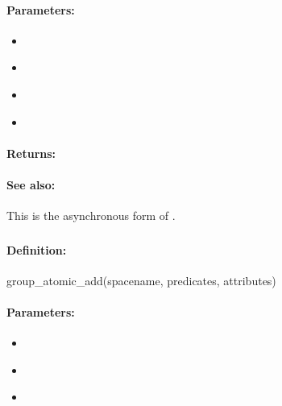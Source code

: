 \paragraph{Parameters:}
\begin{itemize}[noitemsep]
\item {}\\

\item {}\\

\item {}\\

\item {}\\

\end{itemize}

\paragraph{Returns:}


\paragraph{See also:}  This is the asynchronous form of .

\pagebreak
\subsubsection{}
\label{api:ruby:group_atomic_add}


\paragraph{Definition:}
\begin{rubycode}
group_atomic_add(spacename, predicates, attributes)
\end{rubycode}

\paragraph{Parameters:}
\begin{itemize}[noitemsep]
\item {}\\

\item {}\\

\item {}\\

\end{itemize}

